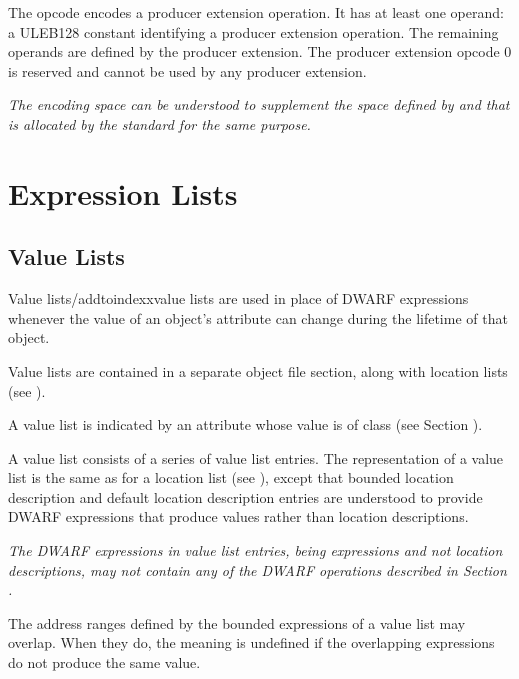\begin{enumerate}[1. ]
\bb
\itembfnl{\DWOPuserextendedTARG}
The \DWOPuserextendedNAME{} opcode encodes a
\bb
producer
\eb
extension operation.
It has at least one operand: a ULEB128 constant identifying a
\bb
producer
\eb
extension operation. The remaining operands are defined by the
\bb
producer
\eb
extension. The
\bb
producer
\eb
extension opcode 0 is reserved and cannot be used by any
\bb
producer
\eb
extension.

\textit{The \DWOPuserextended{} encoding space can be understood to supplement
the space defined by \DWOPlouser{} and \DWOPhiuser{} that is allocated by
the standard for the same purpose.}
\eb

\end{enumerate}

\section{Expression Lists}
\label{chap:expressionlists}
\bb

\subsection{Value Lists}
\label{chap:valuelists}
Value lists/addtoindexx{value lists} are used in place of
DWARF expressions whenever the value of an object's attribute
can change during the lifetime of that object.

Value lists are contained in a separate object file section,
along with location lists (see ).

A value list is indicated by an attribute whose value is of class
\label{chap:classvallist}\CLASSvallist{} (see Section ).

A value list consists of a series of value list entries.
The representation of a value list is the same as for a
location list (see ), except
that bounded location description and default location description
entries are understood to provide DWARF expressions that produce
values rather than location descriptions.

\textit{The DWARF expressions in value list entries, being
expressions and not location descriptions, may not contain
any of the DWARF operations described in Section
.}

The address ranges defined by the bounded expressions of a
value list may overlap. When they do, the meaning is undefined
if the overlapping expressions do not produce the same value.
\eb

